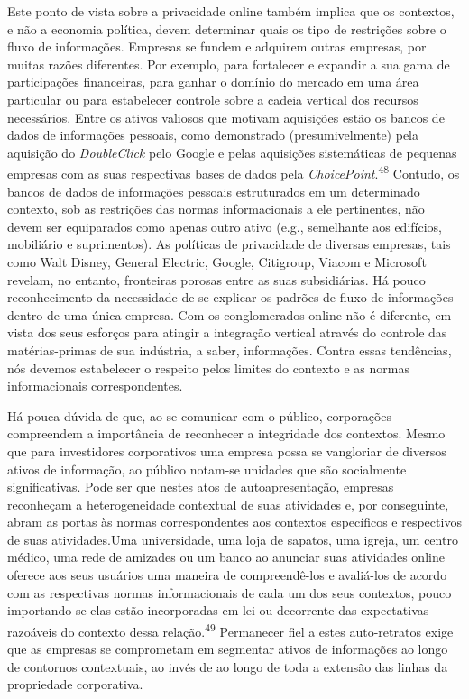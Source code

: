 Este ponto de vista sobre a privacidade online também implica que os
contextos, e não a economia política, devem determinar quais os tipo de
restrições sobre o fluxo de informações. Empresas se fundem e adquirem
outras empresas, por muitas razões diferentes. Por exemplo, para
fortalecer e expandir a sua gama de participações financeiras, para
ganhar o domínio do mercado em uma área particular ou para estabelecer
controle sobre a cadeia vertical dos recursos necessários. Entre os
ativos valiosos que motivam aquisições estão os bancos de dados de
informações pessoais, como demonstrado (presumivelmente) pela aquisição
do \emph{DoubleClick} pelo Google e pelas aquisições sistemáticas de
pequenas empresas com as suas respectivas bases de dados pela
\emph{ChoicePoint}.\textsuperscript{{48}} Contudo, os bancos de dados de
informações pessoais estruturados em um determinado contexto, sob as
restrições das normas informacionais a ele pertinentes, não devem ser
equiparados como apenas outro ativo (e.g., semelhante aos edifícios,
mobiliário e suprimentos). As políticas de privacidade de diversas
empresas, tais como Walt Disney, General Electric, Google, Citigroup,
Viacom e Microsoft revelam, no entanto, fronteiras porosas entre as suas
subsidiárias. Há pouco reconhecimento da necessidade de se explicar os
padrões de fluxo de informações dentro de uma única empresa. Com os
conglomerados online não é diferente, em vista dos seus esforços para
atingir a integração vertical através do controle das matérias-primas de
sua indústria, a saber, informações. Contra essas tendências, nós
devemos estabelecer o respeito pelos limites do contexto e as normas
informacionais correspondentes.

Há pouca dúvida de que, ao se comunicar com o público, corporações
compreendem a importância de reconhecer a integridade dos contextos.
Mesmo que para investidores corporativos uma empresa possa se vangloriar
de diversos ativos de informação, ao público notam-se unidades que são
socialmente significativas. Pode ser que nestes atos de
autoapresentação, empresas reconheçam a heterogeneidade contextual de
suas atividades e, por conseguinte, abram as portas às normas
correspondentes aos contextos específicos e respectivos de suas
atividades.Uma universidade, uma loja de sapatos, uma igreja, um centro
médico, uma rede de amizades ou um banco ao anunciar suas atividades
online oferece aos seus usuários uma maneira de compreendê-los e
avaliá-los de acordo com as respectivas normas informacionais de cada um
dos seus contextos, pouco importando se elas estão incorporadas em lei
ou decorrente das expectativas razoáveis do contexto dessa
relação.\textsuperscript{{49}} Permanecer fiel a estes auto-retratos
exige que as empresas se comprometam em segmentar ativos de informações
ao longo de contornos contextuais, ao invés de ao longo de toda a
extensão das linhas da propriedade corporativa.

